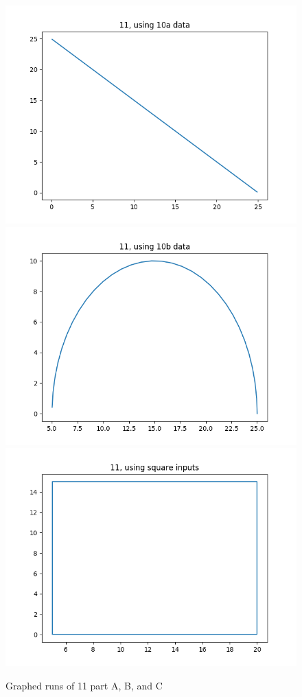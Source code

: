 \documentclass[letterpaper,11pt]{texMemo} %
\begin{document}
\begin{figure}[ht]
\caption{Graphed runs of 11 part A, B, and C}
\centering
\includegraphics[scale=0.45]{img/11a.png}
\includegraphics[scale=0.45]{img/11b.png}
\includegraphics[scale=0.45]{img/11c.png}
\end{figure}
\end{document}
